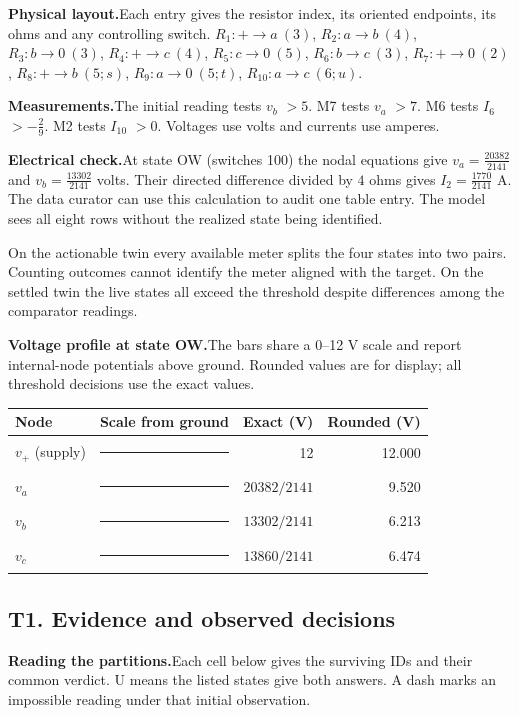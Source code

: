 \documentclass[12pt,letterpaper]{article}
\newcommand{\reading}[2]{\par\smallskip\textsf{\color{accent}\bfseries #1}\enspace #2\par}
\begin{document}
\reading{Physical layout.}{Each entry gives the resistor index, its oriented endpoints, its ohms and any controlling switch. $R_{1}\colon +\to a\ (3)$, $R_{2}\colon a\to b\ (4)$, $R_{3}\colon b\to 0\ (3)$, $R_{4}\colon +\to c\ (4)$, $R_{5}\colon c\to 0\ (5)$, $R_{6}\colon b\to c\ (3)$, $R_{7}\colon +\to 0\ (2)$, $R_{8}\colon +\to b\ (5;s)$, $R_{9}\colon a\to 0\ (5;t)$, $R_{10}\colon a\to c\ (6;u)$.}

\reading{Measurements.}{The initial reading tests $v_{b}$ $>5$. M7 tests $v_{a}$ $>7$. M6 tests $I_{6}$ $>-\tfrac{2}{9}$. M2 tests $I_{10}$ $>0$. Voltages use volts and currents use amperes.}

\reading{Electrical check.}{At state OW (switches 100) the nodal equations give $v_{a}=\tfrac{20382}{2141}$ and $v_{b}=\tfrac{13302}{2141}$ volts. Their directed difference divided by $4$ ohms gives $I_{2}=\tfrac{1770}{2141}$ A. The data curator can use this calculation to audit one table entry. The model sees all eight rows without the realized state being identified.}

On the actionable twin every available meter splits the four states into two pairs. Counting outcomes cannot identify the meter aligned with the target. On the settled twin the live states all exceed the threshold despite differences among the comparator readings.
\reading{Voltage profile at state OW.}{The bars share a 0--12 V scale and report internal-node potentials above ground. Rounded values are for display; all threshold decisions use the exact values.}

\begin{center}{\footnotesize\setlength{\tabcolsep}{4pt}\begin{tabularx}{\linewidth}{@{}lYrr@{}}\toprule
Node & Scale from ground & Exact (V) & Rounded (V)\\ \midrule
$v_{+}$ (supply) & {\color{mute}\rule{132pt}{1.4pt}} & 12 & 12.000\\
$v_{a}$ & {\color{accent}\rule{104.718pt}{3.4pt}} & $20382/2141$ & 9.520\\
$v_{b}$ & {\color{accent}\rule{68.343pt}{3.4pt}} & $13302/2141$ & 6.213\\
$v_{c}$ & {\color{accent}\rule{71.210pt}{3.4pt}} & $13860/2141$ & 6.474\\ \bottomrule\end{tabularx}}
\end{center}

\clearpage\subsection*{T1. Evidence and observed decisions}
\reading{Reading the partitions.}{Each cell below gives the surviving IDs and their common verdict. U means the listed states give both answers. A dash marks an impossible reading under that initial observation.}
\end{document}
